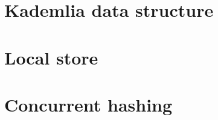 
\section{Kademlia data structure \statusred}    
                        
\section{Local store \statusred}

\section{Concurrent hashing \statusred}
